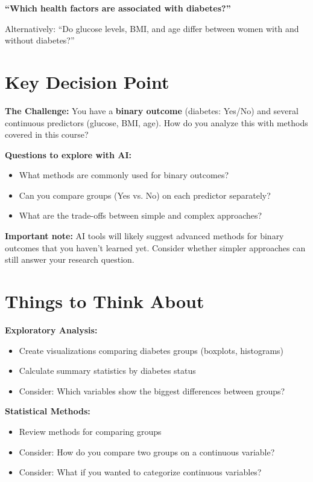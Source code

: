 \documentclass[11pt]{article}
\begin{document}
\textbf{``Which health factors are associated with diabetes?''}

Alternatively: ``Do glucose levels, BMI, and age differ between women with and without diabetes?''

\section*{Key Decision Point}

\begin{tcolorbox}[colback=osaorange!10,colframe=osaorange,boxrule=1pt,arc=2pt]
\textbf{The Challenge:} You have a \textbf{binary outcome} (diabetes: Yes/No) and several continuous predictors (glucose, BMI, age). How do you analyze this with methods covered in this course?

\textbf{Questions to explore with AI:}
\begin{itemize}
\item What methods are commonly used for binary outcomes?
\item Can you compare groups (Yes vs. No) on each predictor separately?
\item What are the trade-offs between simple and complex approaches?
\end{itemize}

\textbf{Important note:} AI tools will likely suggest advanced methods for binary outcomes that you haven't learned yet. Consider whether simpler approaches can still answer your research question.
\end{tcolorbox}

\section*{Things to Think About}

\noindent\textbf{Exploratory Analysis:}
\begin{itemize}
\item Create visualizations comparing diabetes groups (boxplots, histograms)
\item Calculate summary statistics by diabetes status
\item Consider: Which variables show the biggest differences between groups?
\end{itemize}

\noindent\textbf{Statistical Methods:}
\begin{itemize}
\item Review methods for comparing groups
\item Consider: How do you compare two groups on a continuous variable?
\item Consider: What if you wanted to categorize continuous variables?
\end{itemize}
\end{document}
